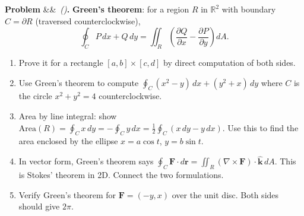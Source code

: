\documentclass[12pt,a4paper]{article}
\newcounter{problem}
\newenvironment{problem}[1][]{\refstepcounter{problem}\par\vspace{6pt}\noindent\textbf{\color{MidBlue}Problem \theproblem}\ifx&#1&\else\ \textit{(#1)}\fi\textbf{.}\enskip}{\par\vspace{4pt}}
\begin{document}
\begin{problem}
\label{prob:greens_thm}
\textbf{Green's theorem}: for a region $R$ in $\mathbb{R}^2$ with boundary $C = \partial R$ (traversed counterclockwise),
\[
  \oint_C P\,dx + Q\,dy = \iint_R\left(\frac{\partial Q}{\partial x}-\frac{\partial P}{\partial y}\right)dA.
\]
\begin{enumerate}[label=(\alph*),topsep=2pt]
  \item Prove it for a rectangle $[a,b]\times[c,d]$ by direct computation of both sides.
  \item Use Green's theorem to compute $\oint_C(x^2-y)\,dx + (y^2+x)\,dy$ where $C$ is the circle $x^2+y^2=4$ counterclockwise.
  \item Area by line integral: show $\text{Area}(R) = \oint_C x\,dy = -\oint_C y\,dx = \frac{1}{2}\oint_C(x\,dy - y\,dx)$. Use this to find the area enclosed by the ellipse $x=a\cos t$, $y=b\sin t$.
  \item In vector form, Green's theorem says $\oint_C\mathbf{F}\cdot d\mathbf{r} = \iint_R(\nabla\times\mathbf{F})\cdot\hat{\mathbf{k}}\,dA$. This is Stokes' theorem in 2D. Connect the two formulations.
  \item Verify Green's theorem for $\mathbf{F}=(-y,x)$ over the unit disc. Both sides should give $2\pi$.
\end{enumerate}
\end{problem}

\begin{center}
\end{center}
\end{document}
